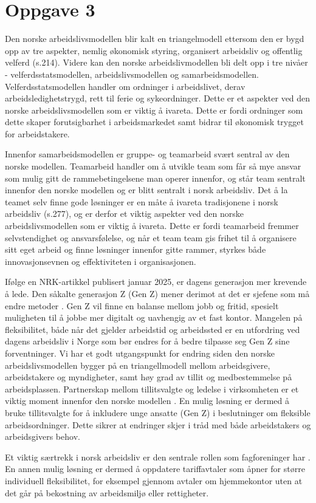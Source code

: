 \section{Oppgave 3}
Den norske arbeidslivsmodellen blir kalt en triangelmodell ettersom den er bygd opp av tre aspekter, nemlig økonomisk styring, organisert arbeidsliv og offentlig velferd \parencite{Teknologiledelse} (s.214). 
Videre kan den norske arbeidslivmodellen bli delt opp i tre nivåer - velferdsstatsmodellen, arbeidslivsmodellen og samarbeidsmodellen. 
Velferdsstatsmodellen handler om ordninger i arbeidslivet, derav arbeidsledighetstrygd, rett til ferie og sykeordninger. 
Dette er et aspekter ved den norske arbeidslivsmodellen som er viktig å ivareta. Dette er fordi ordninger som dette skaper forutsigbarhet i arbeidsmarkedet samt bidrar til økonomisk trygget for arbeidstakere.
 
Innenfor samarbeidsmodellen er gruppe- og teamarbeid svært sentral av den norske modellen. 
Teamarbeid handler om å utvikle team som får så mye ansvar som mulig gitt de rammebetingelsene man operer innenfor, og står team sentralt innenfor den norske modellen og er blitt sentralt i norsk arbeidsliv. 
Det å la teamet selv finne gode løsninger er en måte å ivareta tradisjonene i norsk arbeidsliv \parencite{Teknologiledelse} (s.277), og er derfor et viktig aspekter ved den norske arbeidslivsmodellen som er viktig å ivareta. 
Dette er fordi teamarbeid fremmer selvstendighet og ansvarsfølelse, og når et team team gis frihet til å organisere sitt eget arbeid og finne løsninger innenfor gitte rammer, styrkes både innovasjonsevnen og effektiviteten i organisasjonen.
 
Ifølge en NRK-artikkel publisert januar 2025, er dagens generasjon mer krevende å lede. Den såkalte generasjon Z (Gen Z) mener derimot at det er sjefene som må endre metoder \parencite{NRK}. Gen Z vil finne en balanse mellom jobb og fritid, spesielt muligheten til å jobbe mer digitalt og uavhengig av et fast kontor.  Mangelen på fleksibilitet, både når det gjelder arbeidstid og arbeidssted er en utfordring ved dagens arbeidsliv i Norge som bør endres for å bedre tilpasse seg Gen Z sine forventninger. Vi har et godt utgangspunkt for endring siden den norske arbeidslivsmodellen bygger på en triangellmodell mellom arbeidsgivere, arbeidstakere og myndigheter, samt høy grad av tillit og medbestemmelse på arbeidsplassen. Partnerskap mellom tillitsvalgte og ledelse i virksomheten er et viktig moment innenfor den norske modellen \parencite[229]{Teknologiledelse}. 
En mulig løsning er dermed å bruke tillitsvalgte for å inkludere unge ansatte (Gen Z) i beslutninger om fleksible arbeidsordninger. Dette sikrer at endringer skjer i tråd med både arbeidstakers og arbeidsgivers behov.
 
 
Et viktig særtrekk i norsk arbeidsliv er den sentrale rollen som fagforeninger har \parencite[214]{Teknologiledelse}. En annen mulig løsning er dermed å oppdatere tariffavtaler som åpner for større individuell fleksibilitet, for eksempel gjennom avtaler om hjemmekontor uten at det går på bekostning av arbeidsmiljø eller rettigheter. 